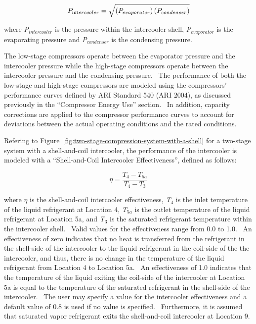 \begin{equation}
{P_{{\mathop{\rm int}} ercooler}} = \sqrt {\left( {{P_{evaporator}}} \right)\left( {{P_{condenser}}} \right)}
\end{equation}

where \emph{P\(_{intercooler}\)} is the pressure within the intercooler shell, \emph{P\(_{evaporator}\)} is the evaporating pressure and \emph{P\(_{condenser}\)} is the condensing pressure.

The low-stage compressors operate between the evaporator pressure and the intercooler pressure while the high-stage compressors operate between the intercooler pressure and the condensing pressure.~ The performance of both the low-stage and high-stage compressors are modeled using the compressors' performance curves defined by ARI Standard 540 (ARI 2004), as discussed previously in the ``Compressor Energy Use'' section.~ In addition, capacity corrections are applied to the compressor performance curves to account for deviations between the actual operating conditions and the rated conditions.

Refering to Figure~\ref{fig:two-stage-compression-system-with-a-shell} for a two-stage system with a shell-and-coil intercooler, the performance of the intercooler is modeled with a ``Shell-and-Coil Intercooler Effectiveness'', defined as follows:

\begin{equation}
\eta  = \frac{{{T_4} - {T_{5a}}}}{{{T_4} - {T_3}}}
\end{equation}

where \(\eta\) is the shell-and-coil intercooler effectiveness, \emph{T}\(_{4}\) is the inlet temperature of the liquid refrigerant at Location 4, \emph{T}\(_{5a}\) is the outlet temperature of the liquid refrigerant at Location 5a, and \emph{T}\(_{3}\) is the saturated refrigerant temperature within the intercooler shell.~ Valid values for the effectiveness range from 0.0 to 1.0.~ An effectiveness of zero indicates that no heat is transferred from the refrigerant in the shell-side of the intercooler to the liquid refrigerant in the coil-side of the the intercooler, and thus, there is no change in the temperature of the liquid refrigerant from Location 4 to Location 5a.~ An effectiveness of 1.0 indicates that the temperature of the liquid exiting the coil-side of the intercooler at Location 5a is equal to the temperature of the saturated refrigerant in the shell-side of the intercooler.~ The user may specify a value for the intercooler effectiveness and a default value of 0.8 is used if no value is specified.~ Furthermore, it is assumed that saturated vapor refrigerant exits the shell-and-coil intercooler at Location 9.

